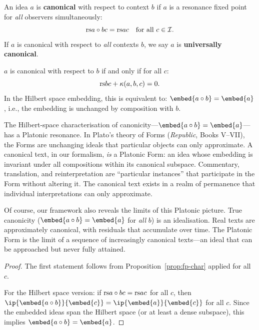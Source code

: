 \begin{definition}
\label{def:canonical}
An idea $a$ is \textbf{canonical} with respect to context $b$ if $a$ is a
resonance fixed point for \emph{all} observers simultaneously:
\[
  \mathrm{rs}{a \circ b}{c} = \mathrm{rs}{a}{c} \quad \text{for all } c \in \mathcal{I}.
\]
If $a$ is canonical with respect to \emph{all} contexts $b$, we say $a$ is
\textbf{universally canonical}.
\end{definition}

\begin{proposition}
\label{prop:canonical-char}
$a$ is canonical with respect to $b$ if and only if for all $c$:
\[
  \mathrm{rs}{b}{c} + \kappa(a, b, c) = 0.
\]
In the Hilbert space embedding, this is equivalent to:
$\embed{a \compose b} = \embed{a}$, i.e., the embedding is unchanged by
composition with $b$.
\end{proposition}

\begin{remark}
\label{rem:ch10:canonical_embed_plato}
The Hilbert-space characterisation of canonicity---$\embed{a \compose b} =
\embed{a}$---has a Platonic resonance.  In Plato's theory of Forms
(\emph{Republic}, Books V--VII), the Forms are unchanging ideals that
particular objects can only approximate.  A canonical text, in our
formalism, \emph{is} a Platonic Form: an idea whose embedding is invariant
under all compositions within its canonical subspace.  Commentary,
translation, and reinterpretation are ``particular instances'' that
participate in the Form without altering it.  The canonical text exists in a
realm of permanence that individual interpretations can only approximate.

Of course, our framework also reveals the limits of this Platonic picture.
True canonicity ($\embed{a \compose b} = \embed{a}$ for \emph{all} $b$) is
an idealisation.  Real texts are approximately canonical, with residuals
that accumulate over time.  The Platonic Form is the limit of a sequence of
increasingly canonical texts---an ideal that can be approached but never
fully attained.
\end{remark}



\begin{proof}
The first statement follows from
Proposition~\ref{prop:fp-char} applied for all $c$.

For the Hilbert space version: if
$\mathrm{rs}{a \circ b}{c} = \mathrm{rs}{a}{c}$ for all $c$, then
$\ip{\embed{a \compose b}}{\embed{c}} = \ip{\embed{a}}{\embed{c}}$ for all
$c$.  Since the embedded ideas span the Hilbert space (or at least a dense
subspace), this implies $\embed{a \compose b} = \embed{a}$.
\end{proof}

